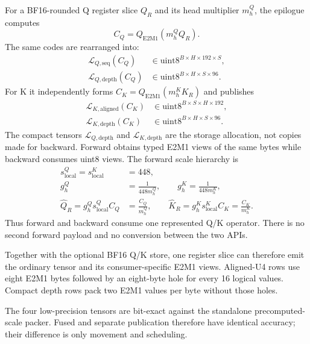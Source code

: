 For a BF16-rounded Q register slice $Q_R$ and its head multiplier $m^Q_h$, the
epilogue computes
\begin{equation}
  C_Q=Q_{\mathrm{E2M1}}(m^Q_hQ_R).
  \label{eq:projection-epilogue-q}
\end{equation}
The same codes are rearranged into:
\begin{align}
  \mathcal L_{Q,\mathrm{seq}}(C_Q)
    &\in\mathrm{uint8}^{B\times H\times192\times S},\\
  \mathcal L_{Q,\mathrm{depth}}(C_Q)
    &\in\mathrm{uint8}^{B\times H\times S\times96}.
  \label{eq:q-layout-functions}
\end{align}
For K it independently forms $C_K=Q_{\mathrm{E2M1}}(m^K_hK_R)$ and publishes
\begin{align}
  \mathcal L_{K,\mathrm{aligned}}(C_K)
    &\in\mathrm{uint8}^{B\times S\times H\times192},\\
  \mathcal L_{K,\mathrm{depth}}(C_K)
    &\in\mathrm{uint8}^{B\times H\times S\times96}.
  \label{eq:k-layout-functions}
\end{align}
The compact tensors $\mathcal L_{Q,\mathrm{depth}}$ and
$\mathcal L_{K,\mathrm{depth}}$ are the storage allocation, not copies made
for backward.  Forward obtains typed E2M1 views of the same bytes while
backward consumes uint8 views.  The forward scale hierarchy is
\begin{align}
  s^{Q}_{\mathrm{local}}=s^{K}_{\mathrm{local}}&=448,\\
  g^Q_h&=\frac{1}{448m^Q_h},\qquad
  g^K_h=\frac{1}{448m^K_h},\\
  \widehat Q_R=g^Q_hs^Q_{\mathrm{local}}C_Q&=\frac{C_Q}{m^Q_h},\qquad
  \widehat K_R=g^K_hs^K_{\mathrm{local}}C_K=\frac{C_K}{m^K_h}.
  \label{eq:shared-qk-forward-reconstruction}
\end{align}
Thus forward and backward consume one represented Q/K operator.  There is no
second forward payload and no conversion between the two APIs.

Together with the optional BF16 Q/K store, one register slice can therefore
emit the ordinary tensor and its consumer-specific E2M1 views.
Aligned-U4 rows use eight E2M1 bytes followed by an eight-byte hole for every
16 logical values.  Compact depth rows pack two E2M1 values per byte without
those holes.

The four low-precision tensors are bit-exact against the standalone
precomputed-scale packer.  Fused and separate publication therefore have
identical accuracy; their difference is only movement and scheduling.

